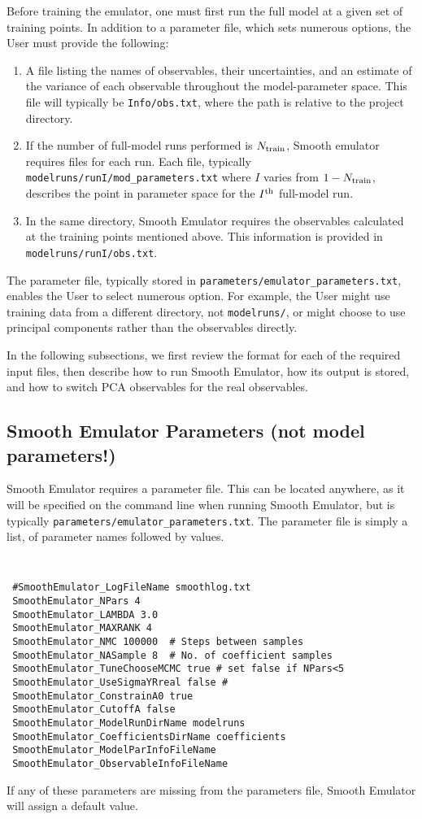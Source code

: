 \documentclass[main.tex]{subfiles}
\begin{document}
Before training the emulator, one must first run the full model at a given set of training points. In addition to a parameter file, which sets numerous options, the User must provide the following:
\begin{enumerate}\itemsep=0pt
    \item A file listing the names of observables, their uncertainties, and an estimate of the variance of each observable throughout the model-parameter space. This file will typically be {\tt Info/obs.txt}, where the path is relative to the project directory. 
    \item If the number of full-model runs performed is $N_{\rm train}$, Smooth emulator requires files for each run. Each file, typically {\tt modelruns/runI/mod\_parameters.txt} where $I$ varies from $1-N_{\rm train}$, describes the point in  parameter space for the $I^{\rm th}$ full-model run. 
    \item In the same directory, Smooth Emulator requires the observables calculated at the training points mentioned above. This information is provided in {\tt modelruns/runI/obs.txt}. 
\end{enumerate}
The parameter file, typically stored in {\tt parameters/emulator\_parameters.txt}, enables the User to select numerous option. For example, the User might use training data from a different directory, not {\tt modelruns/}, or might choose to use principal components rather than the observables directly. 

In the following subsections, we first review the format for each of the required input files, then describe how to run Smooth Emulator, how its output is stored, and how to switch PCA observables for the real observables.

\subsection{Smooth Emulator Parameters (not model parameters!)}

Smooth Emulator requires a parameter file. This can be located anywhere, as it will be specified on the command line when running Smooth Emulator, but is typically {\tt parameters/emulator\_parameters.txt}. The parameter file is simply a list, of parameter names followed by values. 

{\tt
\begin{verbatim}
 #SmoothEmulator_LogFileName smoothlog.txt
 SmoothEmulator_NPars 4
 SmoothEmulator_LAMBDA 3.0
 SmoothEmulator_MAXRANK 4
 SmoothEmulator_NMC 100000  # Steps between samples 
 SmoothEmulator_NASample 8  # No. of coefficient samples
 SmoothEmulator_TuneChooseMCMC true # set false if NPars<5
 SmoothEmulator_UseSigmaYRreal false # 
 SmoothEmulator_ConstrainA0 true
 SmoothEmulator_CutoffA false
 SmoothEmulator_ModelRunDirName modelruns
 SmoothEmulator_CoefficientsDirName coefficients
 SmoothEmulator_ModelParInfoFileName
 SmoothEmulator_ObservableInfoFileName
\end{verbatim}
}
If any of these parameters are missing from the parameters file, Smooth Emulator will assign a default value.
\end{document}
